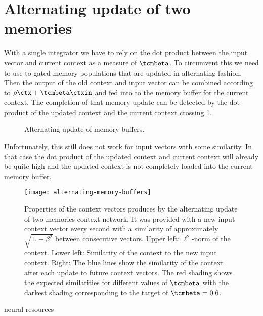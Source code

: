 \section{Alternating update of two memories}
With a single integrator we have to rely on the dot product between the input vector and current context as a measure of $\tcmbeta$.
To circumvent this we need to use to gated memory populations that are updated in alternating fashion.
Then the output of the old context and input vector can be combined according to $\rho \ctx + \tcmbeta \ctxin$ and fed into to the memory buffer for the current context.
The completion of that memory update can be detected by the dot product of the updated context and the current context crossing 1.
\begin{figure}
    \centering
    \caption{Alternating update of memory buffers.}\label{fig:ctx-bounded-integrator}
\end{figure}

Unfortunately, this still does not work for input vectors with some similarity.
In that case the dot product of the updated context and current context will already be quite high and the updated context is not completely loaded into the current memory buffer.
\begin{figure}
    \centering
    \texttt{[image: alternating-memory-buffers]}
    \caption{
        Properties of the context vectors produces by the alternating update of two memories context network.
        It was provided with a new input context vector every second with a similarity of approximately $\sqrt{1. - \beta^2}$ between consecutive vectors.
        Upper left: $\ell^2$-norm of the context.
        Lower left: Similarity of the context to the new input context.
        Right: The blue lines show the similarity of the context after each update to future context vectors.
        The red shading shows the expected similarities for different values of $\tcmbeta$ with the darkest shading corresponding to the target of $\tcmbeta = 0.6$.}\label{fig:alternating-memory-buffers}
\end{figure}
neural resources


